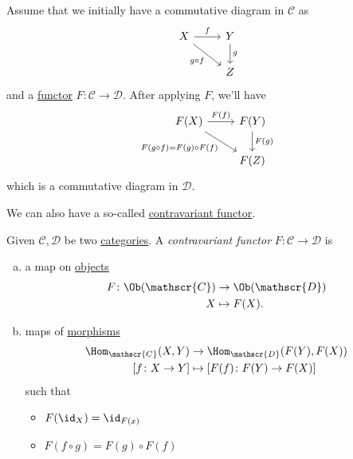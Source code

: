 \begin{eg}
	Assume that we initially have a commutative diagram in \(\mathscr{C} \) as
	\[
		\begin{tikzcd}
			X \ar[rd, "g\circ f"']\ar[r, "f"] & Y\ar[d, "g"]\\
			& Z
		\end{tikzcd}
	\]
	and a \hyperref[def:functor]{functor} \(F\colon \mathscr{C} \to \mathscr{D}\).  After applying \(F\), we'll have
	\[
		\begin{tikzcd}
			F(X) \ar[rd, "F(g\circ f)=F(g)\circ F(f)"']\ar[r, "F(f)"] & F(Y)\ar[d, "F(g)"]\\
			& F(Z)
		\end{tikzcd}
	\]
	which is a commutative diagram in \(\mathscr{D}\).
\end{eg}

We can also have a so-called \underline{contravariant \hyperref[def:functor]{functor}}.

\begin{definition}\label{def:contravariant-functor}
	Given \(\mathscr{C} , \mathscr{D} \) be two \hyperref[def:category]{categories}. A \emph{contravariant functor} \(F\colon \mathscr{C} \to \mathscr{D}\) is
	\begin{enumerate}[(a)]
		\item a map on \hyperref[def:object]{objects}
		      \[
			      \begin{split}
				      F\colon \Ob(\mathscr{C} ) & \to \Ob(\mathscr{D} ) \\
				      X                         & \mapsto F(X).
			      \end{split}
		      \]
		\item maps of \hyperref[def:morphism]{morphisms}
		      \[
			      \begin{split}
				      \Hom_{\mathscr{C} }(X, Y)   & \to \Hom_{\mathscr{D} }(F(Y), F(X))          \\
				      \left[f\colon X\to Y\right] & \mapsto \left[F(f)\colon F(Y)\to F(X)\right]
			      \end{split}
		      \]
		      such that
		      \begin{itemize}
			      \item \(F(\id_{X} ) = \id_{F(x)} \)
			      \item \(F(f\circ g) = F(g)\circ F(f)\)
		      \end{itemize}
	\end{enumerate}
\end{definition}

